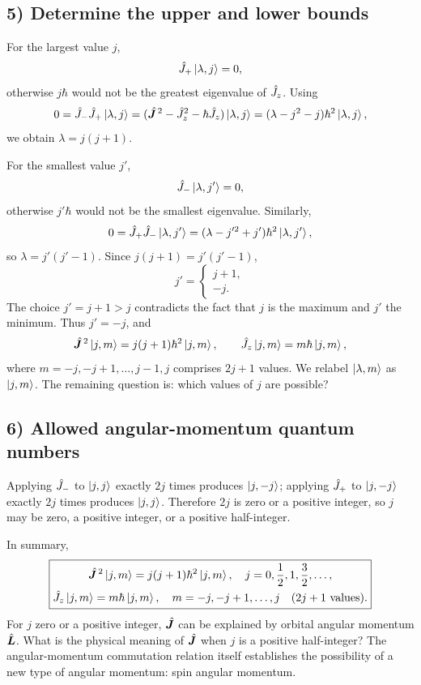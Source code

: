 \subsection*{5) Determine the upper and lower bounds}
For the largest value $j$,
\begin{equation}
\hat{J}_+\left|\lambda,j\right\rangle=0,
\end{equation}
otherwise $j\hbar$ would not be the greatest eigenvalue of $\hat{J}_z$. Using
\begin{equation}
0=\hat{J}_-\hat{J}_+\left|\lambda,j\right\rangle
=(\hat{\bm{J}}^{\,2}-\hat{J}_z^2-\hbar\hat{J}_z)\left|\lambda,j\right\rangle
=(\lambda-j^2-j)\hbar^2\left|\lambda,j\right\rangle,
\end{equation}
we obtain $\lambda=j(j+1)$.

For the smallest value $j'$,
\begin{equation}
\hat{J}_-\left|\lambda,j'\right\rangle=0,
\end{equation}
otherwise $j'\hbar$ would not be the smallest eigenvalue. Similarly,
\begin{equation}
0=\hat{J}_+\hat{J}_-\left|\lambda,j'\right\rangle
=(\lambda-j'^2+j')\hbar^2\left|\lambda,j'\right\rangle,
\end{equation}
so $\lambda=j'(j'-1)$. Since $j(j+1)=j'(j'-1)$,
\begin{equation}
j'=\begin{cases}j+1,\\-j.\end{cases}
\end{equation}
The choice $j'=j+1>j$ contradicts the fact that $j$ is the maximum and $j'$ the minimum. Thus $j'=-j$, and
\begin{equation}
\hat{\bm{J}}^{\,2}\left|j,m\right\rangle=j(j+1)\hbar^2\left|j,m\right\rangle,\qquad
\hat{J}_z\left|j,m\right\rangle=m\hbar\left|j,m\right\rangle,
\end{equation}
where $m=-j,-j+1,\ldots,j-1,j$ comprises $2j+1$ values. We relabel $\left|\lambda,m\right\rangle$ as $\left|j,m\right\rangle$. The remaining question is: which values of $j$ are possible?

\subsection*{6) Allowed angular-momentum quantum numbers}
Applying $\hat{J}_-$ to $\left|j,j\right\rangle$ exactly $2j$ times produces $\left|j,-j\right\rangle$; applying $\hat{J}_+$ to $\left|j,-j\right\rangle$ exactly $2j$ times produces $\left|j,j\right\rangle$. Therefore $2j$ is zero or a positive integer, so $j$ may be zero, a positive integer, or a positive half-integer.

In summary,
\begin{equation}
\boxed{\begin{gathered}
\hat{\bm{J}}^{\,2}\left|j,m\right\rangle=j(j+1)\hbar^2\left|j,m\right\rangle,\quad
j=0,\frac12,1,\frac32,\ldots,\\
\hat{J}_z\left|j,m\right\rangle=m\hbar\left|j,m\right\rangle,\quad
m=-j,-j+1,\ldots,j\quad(2j+1\text{ values}).
\end{gathered}}
\end{equation}
For $j$ zero or a positive integer, $\hat{\bm{J}}$ can be explained by orbital angular momentum $\hat{\bm{L}}$. What is the physical meaning of $\hat{\bm{J}}$ when $j$ is a positive half-integer? The angular-momentum commutation relation itself establishes the possibility of a new type of angular momentum: spin angular momentum.

